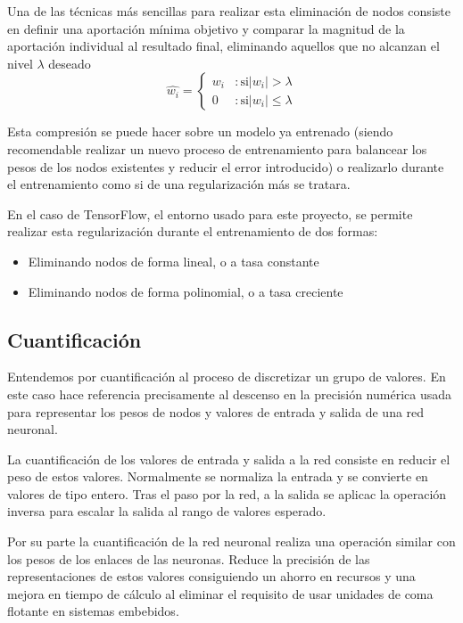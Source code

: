 \documentclass[../tfm.tex]{subfiles}
\begin{document}

Una de las técnicas más sencillas para realizar esta eliminación de nodos consiste en definir una aportación mínima objetivo y comparar la magnitud de la aportación individual al resultado final, eliminando aquellos que no alcanzan el nivel $\lambda$ deseado
\[
\hat{w_i} = \left\{ \begin{matrix} w_i & :\mbox{si} |w_i|>\lambda\\
  0 & :\mbox{si} |w_i|\leq\lambda\end{matrix} \right.
\]

Esta compresión se puede hacer sobre un modelo ya entrenado (siendo recomendable realizar un nuevo proceso de entrenamiento para balancear los pesos de los nodos existentes y reducir el error introducido) o realizarlo durante el entrenamiento como si de una regularización más se tratara.

En el caso de TensorFlow, el entorno usado para este proyecto, se permite realizar esta regularización durante el entrenamiento de dos formas:

\begin{itemize}
\item Eliminando nodos de forma lineal, o a tasa constante
\item Eliminando nodos de forma polinomial, o a tasa creciente
\end{itemize}

\subsection{Cuantificación}
Entendemos por cuantificación al proceso de discretizar un grupo de valores. En este caso hace referencia precisamente al descenso en la precisión numérica usada para representar los pesos de nodos y valores de entrada y salida de una red neuronal.

La cuantificación de los valores de entrada y salida a la red consiste en reducir el peso de estos valores. Normalmente se normaliza la entrada y se convierte en valores de tipo entero. Tras el paso por la red, a la salida se aplicac la operación inversa para escalar la salida al rango de valores esperado.

Por su parte la cuantificación de la red neuronal realiza una operación similar con los pesos de los enlaces de las neuronas. Reduce la precisión de las representaciones de estos valores consiguiendo un ahorro en recursos y una mejora en tiempo de cálculo al eliminar el requisito de usar unidades de coma flotante en sistemas embebidos.
\end{document}
